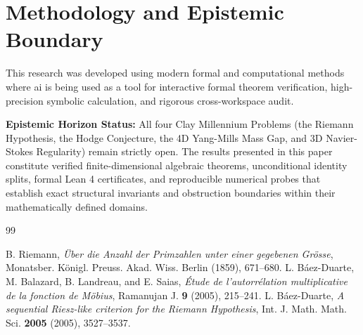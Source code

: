 \documentclass[11pt,a4paper]{article}
\theoremstyle{definition}
\begin{document}
\section{Methodology and Epistemic Boundary}
\noindent This research was developed using modern formal and computational methods where ai is being used as a tool for interactive formal theorem verification, high-precision symbolic calculation, and rigorous cross-workspace audit.

\vspace{0.5em}
\noindent\textbf{Epistemic Horizon Status:} All four Clay Millennium Problems (the Riemann Hypothesis, the Hodge Conjecture, the 4D Yang-Mills Mass Gap, and 3D Navier-Stokes Regularity) remain strictly open. The results presented in this paper constitute verified finite-dimensional algebraic theorems, unconditional identity splits, formal Lean 4 certificates, and reproducible numerical probes that establish exact structural invariants and obstruction boundaries within their mathematically defined domains.

\begin{thebibliography}{99}

 B. Riemann, \emph{\"Uber die Anzahl der Primzahlen unter einer gegebenen Gr\"osse}, Monatsber. K\"onigl. Preuss. Akad. Wiss. Berlin (1859), 671--680.
 L. B\'aez-Duarte, M. Balazard, B. Landreau, and E. Saias, \emph{\'Etude de l'autorr\'elation multiplicative de la fonction de M\"obius}, Ramanujan J. \textbf{9} (2005), 215--241.
 L. B\'aez-Duarte, \emph{A sequential Riesz-like criterion for the Riemann Hypothesis}, Int. J. Math. Math. Sci. \textbf{2005} (2005), 3527--3537.

\end{thebibliography}
\end{document}
